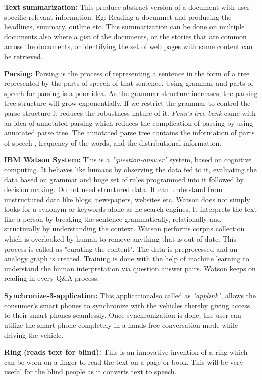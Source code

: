 \documentclass{bmcart}
\begin{document}
\textbf{Text summarization:} This produce abstract version of a document with user specific relevant information. Eg: Reading a documnet and producing the headlines, summary, outline etc. This summarization can be done on multiple documents also where a gist of the documents, or the stories that are common across the documents, or identifying the set of web pages with same content can be retrieved.

\textbf{Parsing:} Parsing is the process of representing a sentence in the form of a tree represented by the parts of speech of that sentence. Using grammar and parts of speech for parsing is a poor idea. As the grammar structure increases, the parsing tree structure will grow exponentially. If we restrict the grammar to control the parse structure it reduces the robustness nature of it. \textit{Penn's tree bank} came with an idea of annotated parsing which reduces the complication of parsing by using annotated parse tree. The annotated parse tree contains the information of parts of speech , frequency of the words, and the distributional information. 

\textbf{IBM Watson System:} This is a \textit{"question-answer"} system, based on cognitive computing. It behaves like humans by observing the data fed to it, evaluating the data based on grammar and huge set of rules programmed into it followed by decision making. Do not need structured data. It can understand from unstructured data like blogs, newspapers, websites etc. Watson does not simply looks for a synonym or keywords alone as he search engines. 	It interprets the text like a person by breaking the sentence grammatically, relationally and structurally by understanding the context. Watson performs corpus collection which is overlooked by human to remove anything that is out of date. This process is called as "curating the content". The data is preprocessed and an analogy graph is created. Training is done with the help of machine learning to understand the human interpretation via question answer pairs. Watson keeps on reading in every Q\&A process. 

\textbf{Synchronize-3-application:} This applicationalso called as \textit{"applink"}, allows the consumer's smart phones to synchronize with the vehicles thereby giving access to their smart phones seamlessly. Once synchronization is done, the user can utilize the smart phone completely in a hands free conversation mode while driving the vehicle. 

\textbf{Ring (reads text for blind):} This is an innovative invention of a ring which can be worn on a finger to read the text on a page or book. This will be very useful for the blind people as it converts text to speech.
\end{document}
